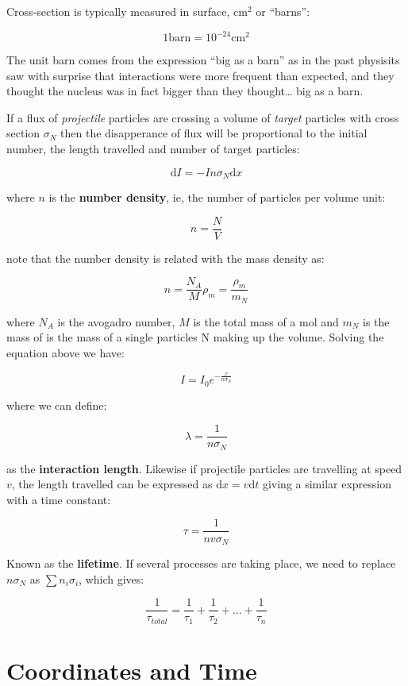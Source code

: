 \documentclass[
  letterpaper,
  DIV=11,
  numbers=noendperiod]{scrreprt}
\begin{document}
Cross-section is typically measured in surface, \(\mathrm{cm}^2\) or
``barns'':

\[ 1 \mathrm{ barn} = 10^{-24} \mathrm{cm}^2\]

The unit barn comes from the expression ``big as a barn'' as in the past
physisits saw with surprise that interactions were more frequent than
expected, and they thought the nucleus was in fact bigger than they
thought\ldots{} big as a barn.

If a flux of \emph{projectile} particles are crossing a volume of
\emph{target} particles with cross section \(\sigma_N\) then the
disapperance of flux will be proportional to the initial number, the
length travelled and number of target particles:

\[ \mathrm{d} I = -I n \sigma_N \mathrm{d} x \]

where \(n\) is the \textbf{number density}, ie, the number of particles
per volume unit:

\[ n = \frac{N}{V} \]

note that the number density is related with the mass density as:

\[n = \frac{N_A}{M} \rho_m = \frac{\rho_m}{m_N}\]

where \(N_A\) is the avogadro number, \(M\) is the total mass of a mol
and \(m_N\) is the mass of is the mass of a single particles N making up
the volume. Solving the equation above we have:

\[I = I_0 e^{-\frac{x}{n\sigma_N}}\]

where we can define:

\[\lambda = \frac{1}{n\sigma_N}\]

as the \textbf{interaction length}. Likewise if projectile particles are
travelling at speed \(v\), the length travelled can be expressed as
\(\mathrm{d}x = v \mathrm{d} t\) giving a similar expression with a time
constant:

\[\tau = \frac{1}{n v\sigma_N}\]

Known as the \textbf{lifetime}. If several processes are taking place,
we need to replace \(n\sigma_N\) as \(\sum n_i\sigma_i\), which gives:

\[\frac{1}{\tau_{total}} = \frac{1}{\tau_1} + \frac{1}{\tau_2} + ... + \frac{1}{\tau_n}\]

\section{Coordinates and Time}\label{coordinates-and-time}
\end{document}
